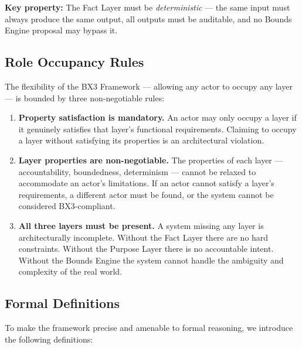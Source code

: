 \documentclass[12pt]{article}
\theoremstyle{plain}
\begin{document}
\textbf{Key property:} The Fact Layer must be \textit{deterministic} --- the same input must always produce the same output, all outputs must be auditable, and no Bounds Engine proposal may bypass it.

\subsection{Role Occupancy Rules}

The flexibility of the BX3 Framework --- allowing any actor to occupy any layer --- is bounded by three non-negotiable rules:

\begin{enumerate}[noitemsep]
    \item \textbf{Property satisfaction is mandatory.} An actor may only occupy a layer if it genuinely satisfies that layer's functional requirements. Claiming to occupy a layer without satisfying its properties is an architectural violation.
    \item \textbf{Layer properties are non-negotiable.} The properties of each layer --- accountability, boundedness, determinism --- cannot be relaxed to accommodate an actor's limitations. If an actor cannot satisfy a layer's requirements, a different actor must be found, or the system cannot be considered BX3-compliant.
    \item \textbf{All three layers must be present.} A system missing any layer is architecturally incomplete. Without the Fact Layer there are no hard constraints. Without the Purpose Layer there is no accountable intent. Without the Bounds Engine the system cannot handle the ambiguity and complexity of the real world.
\end{enumerate}

\subsection{Formal Definitions}

To make the framework precise and amenable to formal reasoning, we introduce the following definitions:
\end{document}
